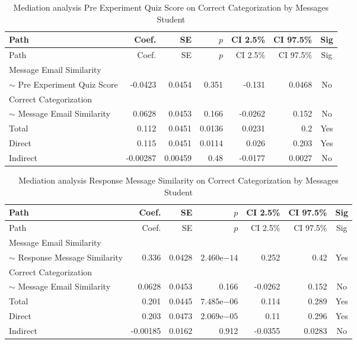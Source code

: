 \begin{longtable}{lrrrrrc}
            \caption{Mediation analysis Pre Experiment Quiz Score on Correct Categorization by  Messages Student}\label{tab:mediation Pre Experiment Quiz Score on Correct Categorization by  Messages Student}\\
            \toprule
            Path & Coef. & SE & $p$ & CI 2.5\% & CI 97.5\% & Sig \\
            \midrule
            \endfirsthead
            \toprule
            Path & Coef. & SE & $p$ & CI 2.5\% & CI 97.5\% & Sig \\
            \midrule
            \endhead
            \bottomrule
            \endfoot
            Message Email Similarity\\ $\sim$ Pre Experiment Quiz Score & -0.0423 & 0.0454 & 0.351 & -0.131 & 0.0468 & No \\
Correct Categorization\\ $\sim$ Message Email Similarity & 0.0628 & 0.0453 & 0.166 & -0.0262 & 0.152 & No \\
Total & 0.112 & 0.0451 & 0.0136 & 0.0231 & 0.2 & Yes \\
Direct & 0.115 & 0.0451 & 0.0114 & 0.026 & 0.203 & Yes \\
Indirect & -0.00287 & 0.00459 & 0.48 & -0.0177 & 0.0027 & No \\
\end{longtable}

\begin{longtable}{lrrrrrc}
            \caption{Mediation analysis Response Message Similarity on Correct Categorization by  Messages Student}\label{tab:mediation Response Message Similarity on Correct Categorization by  Messages Student}\\
            \toprule
            Path & Coef. & SE & $p$ & CI 2.5\% & CI 97.5\% & Sig \\
            \midrule
            \endfirsthead
            \toprule
            Path & Coef. & SE & $p$ & CI 2.5\% & CI 97.5\% & Sig \\
            \midrule
            \endhead
            \bottomrule
            \endfoot
            Message Email Similarity\\ $\sim$ Response Message Similarity & 0.336 & 0.0428 & $2.460\mathrm{e}{-14}$ & 0.252 & 0.42 & Yes \\
Correct Categorization\\ $\sim$ Message Email Similarity & 0.0628 & 0.0453 & 0.166 & -0.0262 & 0.152 & No \\
Total & 0.201 & 0.0445 & $7.485\mathrm{e}{-06}$ & 0.114 & 0.289 & Yes \\
Direct & 0.203 & 0.0473 & $2.069\mathrm{e}{-05}$ & 0.11 & 0.296 & Yes \\
Indirect & -0.00185 & 0.0162 & 0.912 & -0.0355 & 0.0283 & No \\
\end{longtable}

